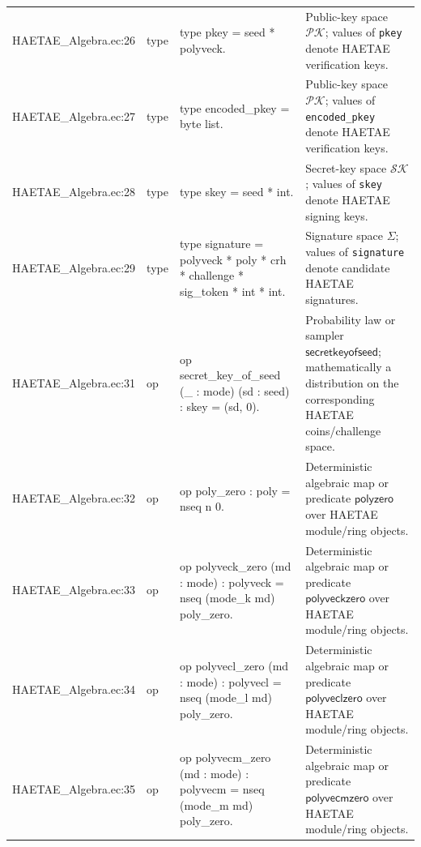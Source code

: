 \documentclass[10pt]{article}
\newcommand{\EC}[1]{\texttt{#1}}
\begin{document}
\begin{longtable}{L{0.11\textwidth}L{0.055\textwidth}L{0.385\textwidth}L{0.41\textwidth}}
HAETAE\_\allowbreak{}Algebra.\allowbreak{}ec:\allowbreak{}26 & type & {\ttfamily\scriptsize type pkey = seed * polyveck.} & Public-key space $\mathcal{PK}$; values of \EC{pkey} denote HAETAE verification keys. \\
HAETAE\_\allowbreak{}Algebra.\allowbreak{}ec:\allowbreak{}27 & type & {\ttfamily\scriptsize type encoded\_\allowbreak{}pkey = byte list.} & Public-key space $\mathcal{PK}$; values of \EC{encoded\_pkey} denote HAETAE verification keys. \\
HAETAE\_\allowbreak{}Algebra.\allowbreak{}ec:\allowbreak{}28 & type & {\ttfamily\scriptsize type skey = seed * int.} & Secret-key space $\mathcal{SK}$; values of \EC{skey} denote HAETAE signing keys. \\
HAETAE\_\allowbreak{}Algebra.\allowbreak{}ec:\allowbreak{}29 & type & {\ttfamily\scriptsize type signature = polyveck * poly * crh * challenge * sig\_\allowbreak{}token * int * int.} & Signature space $\Sigma$; values of \EC{signature} denote candidate HAETAE signatures. \\
HAETAE\_\allowbreak{}Algebra.\allowbreak{}ec:\allowbreak{}31 & op & {\ttfamily\scriptsize op secret\_\allowbreak{}key\_\allowbreak{}of\_\allowbreak{}seed (\_\allowbreak{} : mode) (sd : seed) : skey = (sd, 0).} & Probability law or sampler $\mathsf{secretkeyofseed}$; mathematically a distribution on the corresponding HAETAE coins/challenge space. \\
HAETAE\_\allowbreak{}Algebra.\allowbreak{}ec:\allowbreak{}32 & op & {\ttfamily\scriptsize op poly\_\allowbreak{}zero : poly = nseq n 0.} & Deterministic algebraic map or predicate $\mathsf{polyzero}$ over HAETAE module/ring objects. \\
HAETAE\_\allowbreak{}Algebra.\allowbreak{}ec:\allowbreak{}33 & op & {\ttfamily\scriptsize op polyveck\_\allowbreak{}zero (md : mode) : polyveck = nseq (mode\_\allowbreak{}k md) poly\_\allowbreak{}zero.} & Deterministic algebraic map or predicate $\mathsf{polyveckzero}$ over HAETAE module/ring objects. \\
HAETAE\_\allowbreak{}Algebra.\allowbreak{}ec:\allowbreak{}34 & op & {\ttfamily\scriptsize op polyvecl\_\allowbreak{}zero (md : mode) : polyvecl = nseq (mode\_\allowbreak{}l md) poly\_\allowbreak{}zero.} & Deterministic algebraic map or predicate $\mathsf{polyveclzero}$ over HAETAE module/ring objects. \\
HAETAE\_\allowbreak{}Algebra.\allowbreak{}ec:\allowbreak{}35 & op & {\ttfamily\scriptsize op polyvecm\_\allowbreak{}zero (md : mode) : polyvecm = nseq (mode\_\allowbreak{}m md) poly\_\allowbreak{}zero.} & Deterministic algebraic map or predicate $\mathsf{polyvecmzero}$ over HAETAE module/ring objects. \\

\end{longtable}
\end{document}
